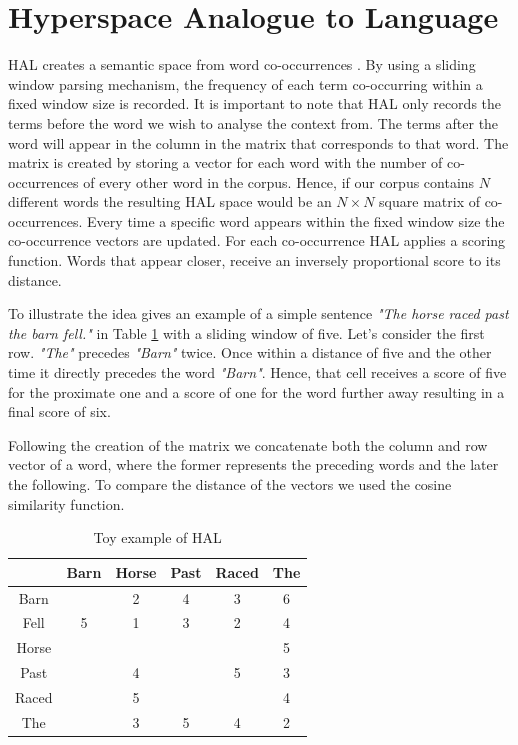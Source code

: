 \documentclass[12pt]{report}
\begin{document}
\section{Hyperspace Analogue to Language}

HAL creates a semantic space from word co-occurrences \cite{lund96}. By using a sliding window parsing mechanism, the frequency of each term co-occurring within a fixed window size is recorded.  It is important to note that HAL only records the terms before the word we wish to analyse the context from. The terms after the word will appear in the column in the matrix that corresponds to that word.  The matrix is created by storing a vector for each word with the number of co-occurrences of every other word in the corpus. Hence, if our corpus contains $N$ different words the resulting HAL space would be an $N \times N$ square matrix of co-occurrences. Every time a specific word appears within the fixed window size the co-occurrence vectors are updated. For each co-occurrence HAL applies a scoring function. Words that appear closer, receive an inversely proportional score to its distance.

 To illustrate the idea \cite{burgess98} gives an example of a simple sentence \emph {"The horse raced past the barn fell."} in Table \ref{tab:halex} with a sliding window of five. Let's consider the first row.  \emph{"The"} precedes \emph{"Barn"} twice. Once within a distance of five and the other time it directly precedes the word  \emph{"Barn"}. Hence, that cell receives a score of five for the proximate one and a score of one for the word further away resulting in a final score of six. 

Following the creation of the matrix we concatenate both the column and row vector of a word, where the former represents the preceding words and the later the following. To compare the distance of the vectors we used the cosine similarity function. 

 



\begin{table}[h]
\centering
\begin{tabular}{ c c c c c c} \toprule
  & Barn & Horse &  Past & Raced & The \\ 
  \hline
 Barn &  & 2 &  4 & 3 & 6 \\ 
 Fell & 5 & 1 &  3 & 2 & 4 \\ 
 Horse &  &  &   &  & 5 \\ 
 Past &  & 4 &   & 5 & 3 \\ 
 Raced &  & 5 &   &  & 4 \\ 
 The &  & 3 &  5 & 4 & 2 \\ 
   \bottomrule
\end{tabular}
\caption{Toy example of HAL}
\label{tab:halex}
\end{table}
\end{document}
